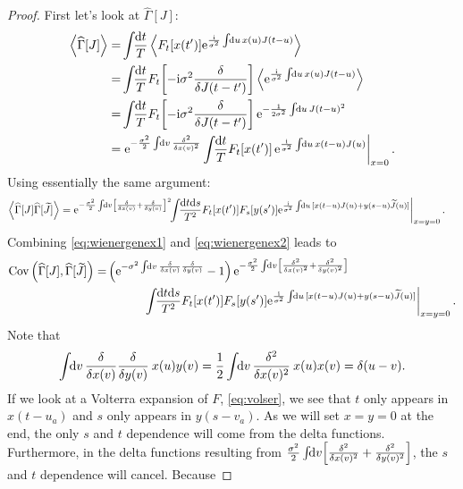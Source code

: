 \documentclass[12pt]{article}
\theoremstyle{slplain}
\theoremstyle{sldefinition}
\theoremstyle{remark}
\newcommand{\tj}{\widetilde{J}}
\newcommand{\hz}{\widehat{\Gamma}}
\begin{document}
\begin{proof}
  First let's look at $\hz[J]$:
  \begin{equation}\label{eq:wienergenex1}
    \begin{aligned}
      \av{\hz[J]} =& \int\!\!\frac{\dr t}{T} \av{F_t[x(t')] \e^{\frac{\ir}{\sigma^2}\intd{u}x(u)J(t-u)}}  \\
        =& \int\!\!\frac{\dr t}{T} F_t\!\brk{-\ir\sigma^2\fdf{}{J(t-t')}} \av{\e^{\frac{\ir}{\sigma^2}\intd{u}x(u)J(t-u)}} \\
        =&  \int\!\!\frac{\dr t}{T} F_t\!\brk{-\ir\sigma^2\fdf{}{J(t-t')}} \e^{-\frac{1}{2\sigma^2}\intd{u}J(t-u)^2} \\
        =& \left. \e^{-\frac{\sigma^2}{2}\intd{v}\fdf{^2}{x(v)^2}} \int\!\!\frac{\dr t}{T} F_t[x(t')] \, \e^{\frac{\ir}{\sigma^2}\intd{u}x(t-u)J(u)} \right|_{x=0}.
    \end{aligned}
  \end{equation}
  Using essentially the same argument:
  \begin{equation}\label{eq:wienergenex2}
    \begin{aligned}
      \av{\hz[J]\hz[\tj]}
        =& \left. \e^{-\frac{\sigma^2}{2}\intd{v}\!\brk{\fdf{}{x(v)}+\fdf{}{y(v)}}^2} \!\!\int\!\!\frac{\dr t\dr s}{T^2} F_t[x(t')] F_s[y(s')] \e^{\frac{\ir}{\sigma^2}\intd{u}[x(t-u)J(u)+y(s-u)\tj(u)]} \right|_{x=y=0}.
    \end{aligned}
  \end{equation}
  Combining \eqref{eq:wienergenex1} and \eqref{eq:wienergenex2} leads to
  \begin{equation}\label{eq:wienergencov}
    \begin{aligned}
      \cov\prn{\hz[J],\hz[\tj]}
        =&
        \prn{\e^{-\sigma^2\intd{v}\fdf{}{x(v)}\fdf{}{y(v)}}-1}
        \e^{-\frac{\sigma^2}{2} \intd{v}\!\brk{\fdf{^2}{x(v)^2}+\fdf{^2}{y(v)^2}}}
        \\& \quad\quad\quad \left.
        \int\!\!\frac{\dr t\dr s}{T^2} F_t[x(t')] F_s[y(s')] \e^{\frac{\ir}{\sigma^2}\intd{u}[x(t-u)J(u)+y(s-u)\tj(u)]} \right|_{x=y=0}.
    \end{aligned}
  \end{equation}
  Note that
  \begin{equation*}
    \intd{v}\fdf{}{x(v)}\fdf{}{y(v)}\: x(u) y(v) =
    \frac{1}{2} \intd{v}\fdf{^2}{x(v)^2}\: x(u)x(v) =
    \delta(u-v).
  \end{equation*}
  If we look at a Volterra expansion of $F$, \eqref{eq:volser}, we see that $t$ only appears in $x(t-u_a)$ and $s$ only appears in $y(s-v_a)$. As we will set $x=y=0$ at the end, the only $s$ and $t$ dependence will come from the delta functions. Furthermore, in the delta functions resulting from $\frac{\sigma^2}{2} \intd{v}\!\!\brk{\fdf{^2}{x(v)^2}+\fdf{^2}{y(v)^2}}$, the $s$ and $t$ dependence will cancel. Because

\end{proof}
\end{document}
